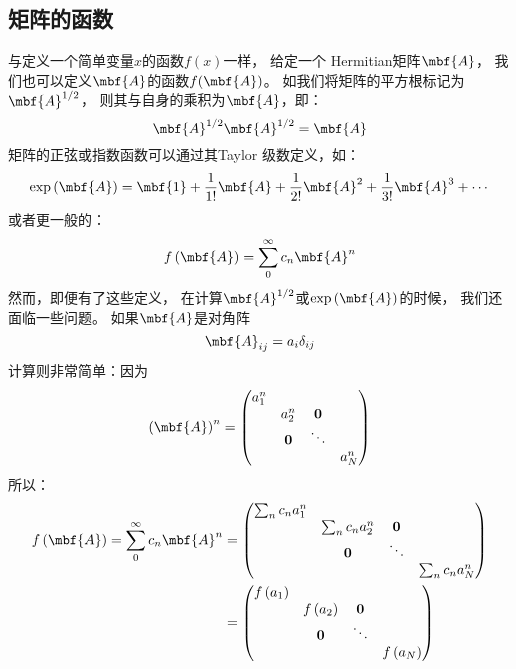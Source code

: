 \subsection{矩阵的函数}
\label{sec:1.1.7}
与定义一个简单变量$x$的函数$f(x)$一样，
给定一个 Hermitian矩阵$\mbf{A}$，
我们也可以定义$\mbf{A}$的函数$f(\mbf{A})$。
如我们将矩阵的平方根标记为$\mbf{A}^{1/2}$，
则其与自身的乘积为$\mbf{A}$，即：
\begin{equation}
 \mbf{A}^{1/2}\mbf{A}^{1/2} = \mbf{A}
 \label{eq:1.108}
\end{equation} 
矩阵的正弦或指数函数可以通过其Taylor 级数定义，如：
\[\exp\left(\mbf{A}\right) = \mbf{1} + \frac{1}{1!}\mbf{A} + \frac{1}{2!}\mbf{A}^2 + \frac{1}{3!}\mbf{A}^3 + \cdots\]
或者更一般的：
\begin{equation}
 f\left(\mbf{A}\right) = \sum_0^{\infty}c_n \mbf{A}^n
 \label{eq:1.109}
\end{equation}
然而，即便有了这些定义，
在计算$\mbf{A}^{1/2}$或$\exp\left(\mbf{A}\right)$的时候，
我们还面临一些问题。
如果$\mbf{A}$是对角阵
\[\mbf{A}_{ij} = a_i\delta_{ij}\]
计算则非常简单：因为
\begin{equation}
 \left(\mbf{A}\right)^n = \begin{pmatrix}
     a_1^n &               &      & \\
                    &a_2^n &\mathbf{0} & \\
           &\mathbf{0} &\ddots & \\
           &               &                &a_N^n
 \end{pmatrix}
 \label{eq:1.110}
\end{equation}
所以：
\begin{equation}
 \begin{split}
     f\left(\mbf{A}\right) = \sum_0^{\infty}c_n \mbf{A}^n &= \begin{pmatrix}
      \sum_n c_n a_1^n &               &      & \\
                     &\sum_n c_n a_2^n &\mathbf{0} & \\
               &\mathbf{0} &\ddots & \\
               &               &                &\sum_n c_n a_N^n
     \end{pmatrix} \\
     &= \begin{pmatrix}
      f\left(a_1\right) &               &      & \\
                     &f\left(a_2\right) &\mathbf{0} & \\
               &\mathbf{0} &\ddots & \\
               &               &                &f\left(a_N\right)
     \end{pmatrix}
 \end{split}
 \label{eq:1.111}
\end{equation}
